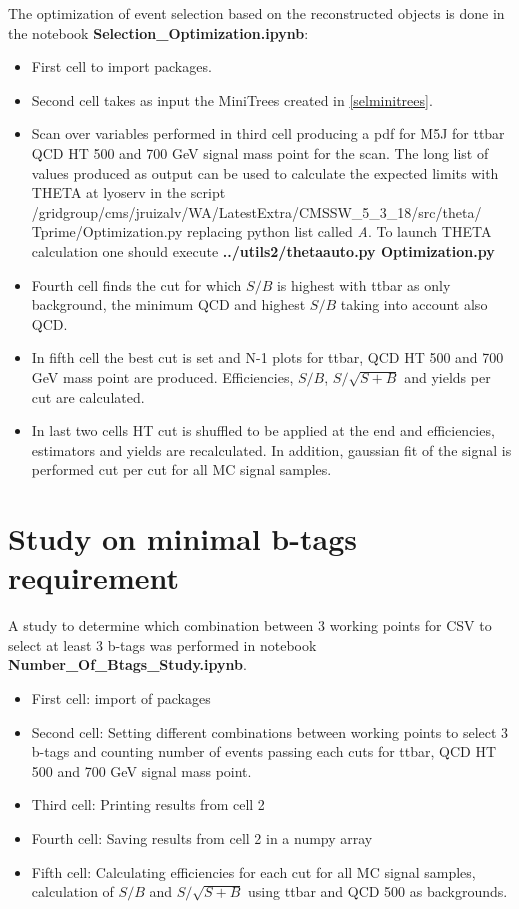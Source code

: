 \documentclass[11pt,a4paper]{article}
\begin{document}
The optimization of event selection based on the reconstructed objects is done in the notebook \textbf{Selection\_Optimization.ipynb}:
\begin{itemize}
\item First cell to import packages.
\item Second cell takes as input the MiniTrees created in \ref{selminitrees}.
\item Scan over variables performed in third cell producing a pdf for M5J for ttbar QCD HT 500 and 700 GeV signal mass point for the scan. The long list of values produced as output can be used to calculate the expected limits with THETA at lyoserv in the script /gridgroup/cms/jruizalv/WA/LatestExtra/CMSSW\_5\_3\_18/src/theta/\\Tprime/Optimization.py replacing python list called \textit{A}. To launch THETA calculation one should execute \textbf{../utils2/theta\-auto.py Optimization.py}
\item Fourth cell finds the cut for which $S/B$ is highest with ttbar as only background, the minimum QCD and highest $S/B$ taking into account also QCD. 
\item In fifth cell the best cut is set and N-1 plots for ttbar, QCD HT 500 and 700 GeV mass point are produced. Efficiencies, $S/B$, $S/\sqrt{S+B}$ and yields per cut are calculated.
\item In last two cells HT cut is shuffled to be applied at the end and efficiencies, estimators and yields are recalculated. In addition, gaussian fit of the signal is performed cut per cut for all MC signal samples.
\end{itemize}

\section{Study on minimal b-tags requirement}

A study to determine which combination between 3 working points for CSV to select at least 3 b-tags was performed in notebook \textbf{Number\_Of\_Btags\_Study.ipynb}. 
\begin{itemize}
\item First cell: import of packages
\item Second cell: Setting different combinations between working points to select 3 b-tags and counting number of events passing each cuts for ttbar, QCD HT 500 and 700 GeV signal mass point. 
\item Third cell: Printing results from cell 2
\item Fourth cell: Saving results from cell 2 in a numpy array
\item Fifth cell: Calculating efficiencies for each cut for all MC signal samples, calculation of $S/B$ and $S/\sqrt{S+B}$ using ttbar and QCD 500 as backgrounds.
\end{itemize}
\end{document}
